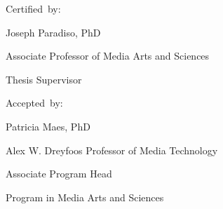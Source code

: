 \begin{addmargin}[1cm]{-2cm}
\begin{flushright}
  Certified~by:\hspace{0.5cm}~\makebox[2.75in]{\hrulefill}

Joseph Paradiso, PhD

Associate Professor of Media Arts and Sciences 
                                 
Thesis Supervisor

  \vspace{15mm}

  Accepted~by:\hspace{0.5cm}~\makebox[2.75in]{\hrulefill}

Patricia Maes, PhD

Alex W. Dreyfoos Professor of Media Technology

Associate Program Head 

Program in Media Arts and Sciences
                                 
\end{flushright}

\end{addmargin}

